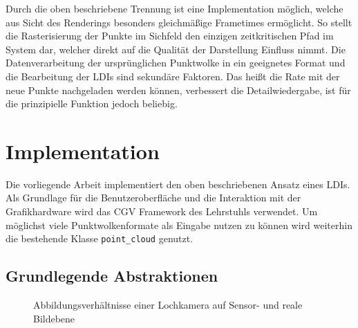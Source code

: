 \documentclass[hyperref, beleg, german]{cgvpub}
\begin{document}
Durch die oben beschriebene Trennung ist eine Implementation möglich, welche
aus Sicht des Renderings besonders gleichmäßige Frametimes ermöglicht. So
stellt die Rasterisierung der Punkte im Sichfeld den einzigen zeitkritischen
Pfad im System dar, welcher direkt auf die Qualität der Darstellung Einfluss
nimmt. Die Datenverarbeitung der ursprünglichen Punktwolke in ein geeignetes
Format und die Bearbeitung der LDIs sind sekundäre Faktoren. Das heißt die Rate
mit der neue Punkte nachgeladen werden können, verbessert die Detailwiedergabe,
ist für die prinzipielle Funktion jedoch beliebig.

\chapter{Implementation}

Die vorliegende Arbeit implementiert den oben beschriebenen Ansatz eines LDIs.
Als Grundlage für die Benutzeroberfläche und die Interaktion mit der
Grafikhardware wird das CGV Framework des Lehrstuhls verwendet. Um möglichst
viele Punktwolkenformate als Eingabe nutzen zu können wird weiterhin die
bestehende Klasse \texttt{point\_cloud} genutzt.

\section{Grundlegende Abstraktionen}

\begin{figure}
	\centering
	
	\caption{Abbildungsverhältnisse einer Lochkamera auf Sensor- und reale
		Bildebene}%
	\label{fig:pinholecamera}
\end{figure}
\end{document}

